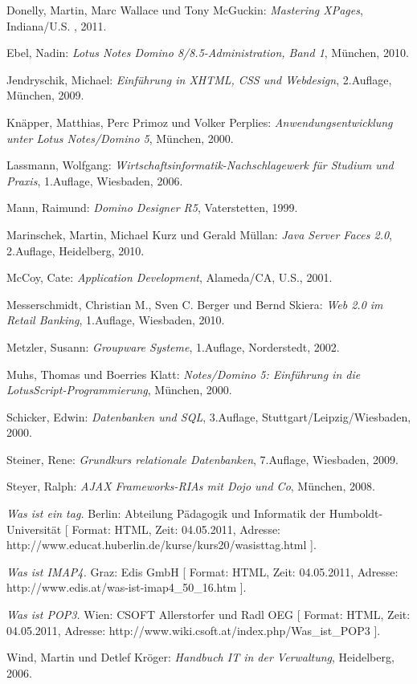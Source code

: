 \documentclass[oneside,bachelor,etd]{BYUPhys}
\begin{document}
\cleardoublepage
  {}
 \begin{thebibliography}{00}



Donelly, Martin, Marc Wallace und Tony McGuckin: {\em Mastering XPages}, Indiana/U.S. , 2011.

Ebel, Nadin: {\em Lotus Notes Domino 8/8.5-Administration, Band 1}, München, 2010.

Jendryschik, Michael: {\em Einführung in XHTML, CSS und Webdesign}, 2.Auflage, München, 2009.

Knäpper, Matthias, Perc Primoz und Volker Perplies: {\em Anwendungsentwicklung unter Lotus Notes/Domino 5}, München, 2000.

Lassmann, Wolfgang: {\em Wirtschaftsinformatik-Nachschlagewerk für Studium und Praxis}, 1.Auflage, Wiesbaden, 2006.

Mann, Raimund: {\em Domino Designer R5}, Vaterstetten, 1999.

Marinschek, Martin, Michael Kurz und Gerald Müllan: {\em Java Server Faces 2.0}, 2.Auflage, Heidelberg, 2010.

McCoy, Cate: {\em Application Development}, Alameda/CA, U.S., 2001.

Messerschmidt, Christian M., Sven C. Berger und Bernd Skiera: {\em Web 2.0 im Retail Banking}, 1.Auflage, Wiesbaden, 2010.

Metzler, Susann: {\em Groupware Systeme}, 1.Auflage, Norderstedt, 2002.

Muhs, Thomas und Boerries Klatt: {\em Notes/Domino 5: Einführung in die LotusScript-Programmierung}, München, 2000.

Schicker, Edwin: {\em Datenbanken und SQL}, 3.Auflage, Stuttgart/Leipzig/Wiesbaden, 2000.

Steiner, Rene: {\em Grundkurs relationale Datenbanken}, 7.Auflage, Wiesbaden, 2009.

Steyer, Ralph: {\em AJAX Frameworks-RIAs mit Dojo und Co}, München, 2008.

{\em Was ist ein tag.} Berlin: Abteilung Pädagogik und Informatik der Humboldt-Universität [ Format: HTML, Zeit: 04.05.2011, 
Adresse: http://www.educat.hu\-berlin.de/kurse/kurs20/wasisttag.html ].

{\em Was ist IMAP4.} Graz: Edis GmbH [ Format: HTML, Zeit: 04.05.2011, Adresse: http://www.edis.at/was-ist-imap4\_50\_16.htm ]. 

{\em Was ist POP3.} Wien: CSOFT Allerstorfer und Radl OEG [ Format: HTML, Zeit: 04.05.2011, Adresse: http://www.wiki.csoft.at/index.php/Was\_ist\_POP3 ]. 

Wind, Martin und Detlef Kröger: {\em Handbuch IT in der Verwaltung}, Heidelberg, 2006.

 \end{thebibliography}
\end{document}
